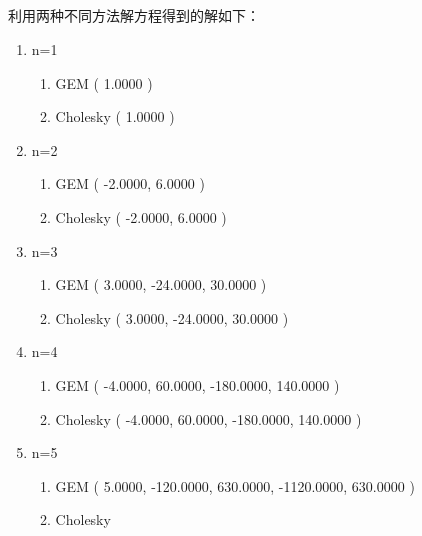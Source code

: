 \documentclass{ctexart}
\begin{document}
    \subsection{}
    利用两种不同方法解方程得到的解如下：
    \begin{enumerate}
        \item n=1
        \begin{enumerate}
            \item GEM\newline
            ( 1.0000 )
            \item Cholesky\newline
            ( 1.0000 )
        \end{enumerate}
        \item n=2
        \begin{enumerate}
            \item GEM\newline
            ( -2.0000, 6.0000 )
            \item Cholesky\newline
            ( -2.0000, 6.0000 )
        \end{enumerate}
        \item n=3
        \begin{enumerate}
            \item GEM\newline
            ( 3.0000, -24.0000, 30.0000 )
            \item Cholesky\newline
            ( 3.0000, -24.0000, 30.0000 )
        \end{enumerate}
        \item n=4
        \begin{enumerate}
            \item GEM\newline
            ( -4.0000, 60.0000, -180.0000, 140.0000 )
            \item Cholesky\newline
            ( -4.0000, 60.0000, -180.0000, 140.0000 )
        \end{enumerate}
        \item n=5
        \begin{enumerate}
            \item GEM\newline
            ( 5.0000, -120.0000, 630.0000, -1120.0000, 630.0000 )
            \item Cholesky\newline

\end{enumerate}
\end{enumerate}
\end{document}
